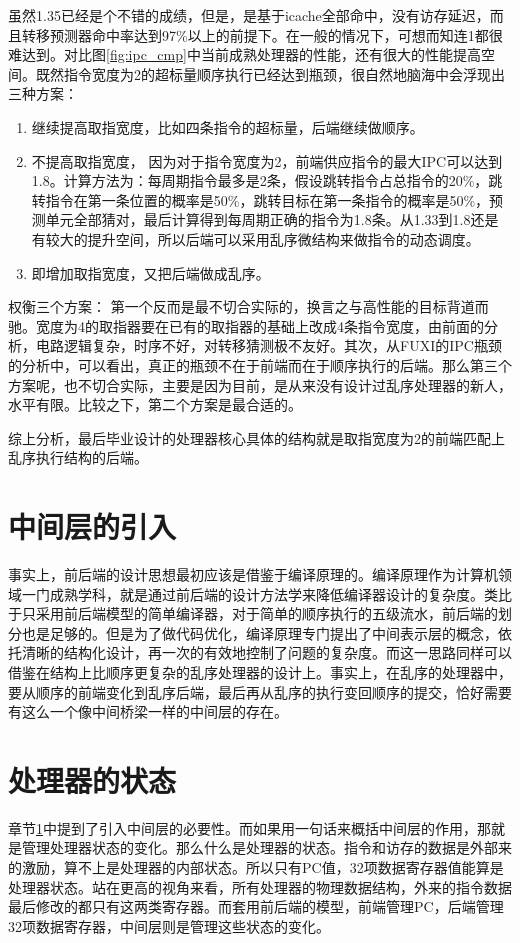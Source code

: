	虽然1.35已经是个不错的成绩，但是，是基于icache全部命中，没有访存延迟，而且转移预测器命中率达到97\%以上的前提下。在一般的情况下，可想而知连1都很难达到。对比图\ref{fig:ipc_cmp}中当前成熟处理器的性能，还有很大的性能提高空间。既然指令宽度为2的超标量顺序执行已经达到瓶颈，很自然地脑海中会浮现出三种方案：
	\begin{enumerate}[label=(\alph*)]
		\item 继续提高取指宽度，比如四条指令的超标量，后端继续做顺序。
		\item 不提高取指宽度， 因为对于指令宽度为2，前端供应指令的最大IPC可以达到1.8。计算方法为：每周期指令最多是2条，假设跳转指令占总指令的20\%，跳转指令在第一条位置的概率是50\%，跳转目标在第一条指令的概率是50\%，预测单元全部猜对，最后计算得到每周期正确的指令为1.8条。从1.33到1.8还是有较大的提升空间，所以后端可以采用乱序微结构来做指令的动态调度。
		\item 即增加取指宽度，又把后端做成乱序。
	\end{enumerate}

	权衡三个方案： 第一个反而是最不切合实际的，换言之与高性能的目标背道而驰。宽度为4的取指器要在已有的取指器的基础上改成4条指令宽度，由前面的分析，电路逻辑复杂，时序不好，对转移猜测极不友好。其次，从FUXI的IPC瓶颈的分析中，可以看出，真正的瓶颈不在于前端而在于顺序执行的后端。那么第三个方案呢，也不切合实际，主要是因为目前，是从来没有设计过乱序处理器的新人，水平有限。比较之下，第二个方案是最合适的。

综上分析，最后毕业设计的处理器核心具体的结构就是取指宽度为2的前端匹配上乱序执行结构的后端。

\section{中间层的引入}\label{subsec:middle_end}
事实上，前后端的设计思想最初应该是借鉴于编译原理的。编译原理作为计算机领域一门成熟学科，就是通过前后端的设计方法学来降低编译器设计的复杂度。类比于只采用前后端模型的简单编译器，对于简单的顺序执行的五级流水，前后端的划分也是足够的。但是为了做代码优化，编译原理专门提出了中间表示层的概念，依托清晰的结构化设计，再一次的有效地控制了问题的复杂度。而这一思路同样可以借鉴在结构上比顺序更复杂的乱序处理器的设计上。事实上，在乱序的处理器中，要从顺序的前端变化到乱序后端，最后再从乱序的执行变回顺序的提交，恰好需要有这么一个像中间桥梁一样的中间层的存在。

\section{处理器的状态}\label{subsec:cpu_state}
章节\ref{subsec:middle_end}中提到了引入中间层的必要性。而如果用一句话来概括中间层的作用，那就是管理处理器状态的变化。那么什么是处理器的状态。指令和访存的数据是外部来的激励，算不上是处理器的内部状态。所以只有PC值，32项数据寄存器值能算是处理器状态。站在更高的视角来看，所有处理器的物理数据结构，外来的指令数据最后修改的都只有这两类寄存器。而套用前后端的模型，前端管理PC，后端管理32项数据寄存器，中间层则是管理这些状态的变化。


